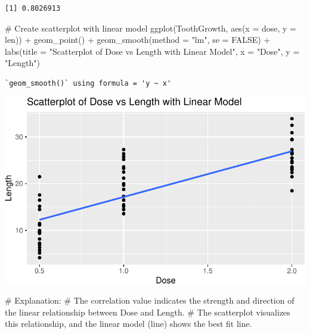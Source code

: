 \documentclass[
  letterpaper,
  DIV=11,
  numbers=noendperiod]{scrreprt}
\newenvironment{Shaded}{\begin{snugshade}}{\end{snugshade}}
\newcommand{\AttributeTok}[1]{\textcolor[rgb]{0.40,0.45,0.13}{#1}}
\newcommand{\CommentTok}[1]{\textcolor[rgb]{0.37,0.37,0.37}{#1}}
\newcommand{\ConstantTok}[1]{\textcolor[rgb]{0.56,0.35,0.01}{#1}}
\newcommand{\FunctionTok}[1]{\textcolor[rgb]{0.28,0.35,0.67}{#1}}
\newcommand{\NormalTok}[1]{\textcolor[rgb]{0.00,0.23,0.31}{#1}}
\newcommand{\SpecialCharTok}[1]{\textcolor[rgb]{0.37,0.37,0.37}{#1}}
\newcommand{\StringTok}[1]{\textcolor[rgb]{0.13,0.47,0.30}{#1}}
\begin{document}
\begin{verbatim}
[1] 0.8026913
\end{verbatim}

\begin{Shaded}
\begin{Highlighting}[]
\CommentTok{\# Create scatterplot with linear model}
\FunctionTok{ggplot}\NormalTok{(ToothGrowth, }\FunctionTok{aes}\NormalTok{(}\AttributeTok{x =}\NormalTok{ dose, }\AttributeTok{y =}\NormalTok{ len)) }\SpecialCharTok{+}
  \FunctionTok{geom\_point}\NormalTok{() }\SpecialCharTok{+}
  \FunctionTok{geom\_smooth}\NormalTok{(}\AttributeTok{method =} \StringTok{"lm"}\NormalTok{, }\AttributeTok{se =} \ConstantTok{FALSE}\NormalTok{) }\SpecialCharTok{+}
  \FunctionTok{labs}\NormalTok{(}\AttributeTok{title =} \StringTok{"Scatterplot of Dose vs Length with Linear Model"}\NormalTok{, }\AttributeTok{x =} \StringTok{"Dose"}\NormalTok{, }\AttributeTok{y =} \StringTok{"Length"}\NormalTok{)}
\end{Highlighting}
\end{Shaded}

\begin{verbatim}
`geom_smooth()` using formula = 'y ~ x'
\end{verbatim}

\includegraphics{Linear_Modeling_and_Regression_files/figure-pdf/unnamed-chunk-18-1.pdf}

\begin{Shaded}
\begin{Highlighting}[]
\CommentTok{\# Explanation:}
\CommentTok{\# The correlation value indicates the strength and direction of the linear relationship between Dose and Length.}
\CommentTok{\# The scatterplot visualizes this relationship, and the linear model (line) shows the best fit line.}
\end{Highlighting}
\end{Shaded}
\end{document}
